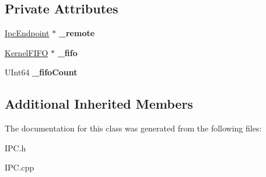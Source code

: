 \subsection*{Private Attributes}
\begin{DoxyCompactItemize}
\item 
\mbox{\label{class_ipc_endpoint_a855a86e1275925fb2ef0af17a4b08cb1}} 
\hyperlink{class_ipc_endpoint}{Ipc\+Endpoint} $\ast$ {\bfseries \+\_\+remote}
\item 
\mbox{\label{class_ipc_endpoint_a72260227854eaf22da3cfbeaa0948167}} 
\hyperlink{class_kernel_f_i_f_o}{Kernel\+F\+I\+FO} $\ast$ {\bfseries \+\_\+fifo}
\item 
\mbox{\label{class_ipc_endpoint_a163353e1689d2064fd2bc82a379e4335}} 
U\+Int64 {\bfseries \+\_\+fifo\+Count}
\end{DoxyCompactItemize}
\subsection*{Additional Inherited Members}


The documentation for this class was generated from the following files\+:\begin{DoxyCompactItemize}
\item 
I\+P\+C.\+h\item 
I\+P\+C.\+cpp\end{DoxyCompactItemize}

